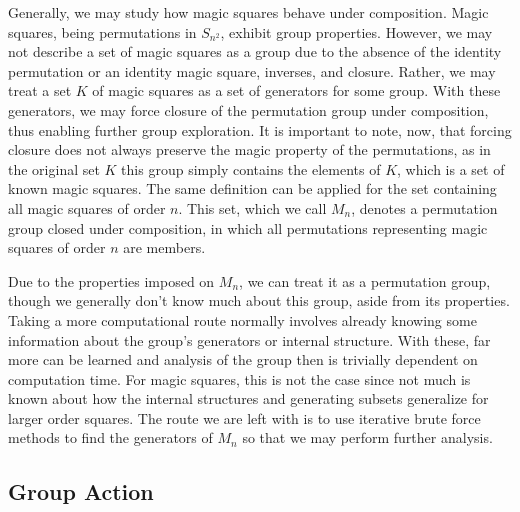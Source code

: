 \documentclass{rhumj_new}
\begin{document}


Generally, we may study how magic squares behave under composition. Magic squares, being
permutations in $S_{n^2}$, exhibit group properties. However, we may not describe a set of magic
squares as a group due to the absence of the identity permutation or an identity magic square,
inverses, and closure. Rather, we may treat a set $K$ of magic squares as a set of generators for
some group. With these generators, we may force closure of the permutation group under composition,
thus enabling further group exploration. It is important to note, now, that forcing closure does
not always preserve the magic property of the permutations, as in the original set $K$
\textemdash{} this group simply contains the elements of $K$, which is a set of known magic
squares. The same definition can be applied for the set containing all magic squares of order $n$.
This set, which we call $M_n$, denotes a permutation group closed under composition, in which all
permutations representing magic squares of order $n$ are members.

Due to the properties imposed on $M_n$, we can treat it as a permutation group, though we generally
don't know much about this group, aside from its properties. Taking a more computational route
normally involves already knowing some information about the group's generators or internal
structure. With these, far more can be learned and analysis of the group then is trivially
dependent on computation time. For magic squares, this is not the case since not much is known
about how the internal structures and generating subsets generalize for larger order squares. The
route we are left with is to use iterative brute force methods to find the generators of $M_n$ so
that we may perform further analysis.

\subsection{Group Action}
\end{document}
